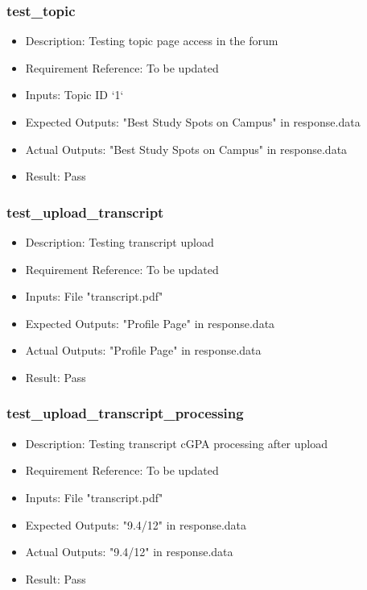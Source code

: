 \documentclass[12pt, titlepage]{article}
\begin{document}
\subsubsection{test\_topic}\label{3.1.13}
\begin{itemize}
    \item Description: Testing topic page access in the forum
    \item Requirement Reference: To be updated
    \item Inputs: Topic ID `1`  
    \item Expected Outputs: "Best Study Spots on Campus" in response.data
    \item Actual Outputs: "Best Study Spots on Campus" in response.data
    \item Result: Pass
\end{itemize}

\subsubsection{test\_upload\_transcript}\label{3.1.14}
\begin{itemize}
    \item Description: Testing transcript upload
    \item Requirement Reference: To be updated
    \item Inputs: File "transcript.pdf"
    \item Expected Outputs: "Profile Page" in response.data
    \item Actual Outputs: "Profile Page" in response.data
    \item Result: Pass
\end{itemize}
\subsubsection{test\_upload\_transcript\_processing}\label{3.1.15}
\begin{itemize}
    \item Description: Testing transcript cGPA processing after upload
    \item Requirement Reference: To be updated
    \item Inputs: File "transcript.pdf"
    \item Expected Outputs: "9.4/12" in response.data
    \item Actual Outputs: "9.4/12" in response.data
    \item Result: Pass
\end{itemize}
\end{document}
